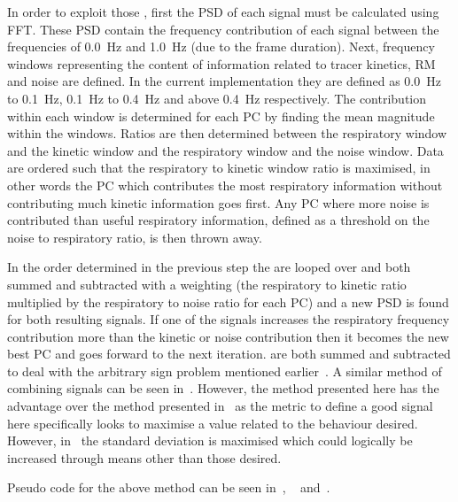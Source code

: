                     In order to exploit those , first the \gls{PSD} of each signal must be calculated using \gls{FFT}. These \gls{PSD} contain the frequency contribution of each signal between the frequencies of \SI{0.0}{\hertz} and \SI{1.0}{\hertz} (due to the frame duration). Next, frequency windows representing the content of information related to tracer kinetics, \gls{RM} and noise are defined. In the current implementation they are defined as \SI{0.0}{\hertz} to \SI{0.1}{\hertz}, \SI{0.1}{\hertz} to \SI{0.4}{\hertz} and above \SI{0.4}{\hertz} respectively. The contribution within each window is determined for each \gls{PC} by finding the mean magnitude within the windows. Ratios are then determined between the respiratory window and the kinetic window and the respiratory window and the noise window. Data are ordered such that the respiratory to kinetic window ratio is maximised, in other words the \gls{PC} which contributes the most respiratory information without contributing much kinetic information goes first. Any \gls{PC} where more noise is contributed than useful respiratory information, defined as a threshold on the noise to respiratory ratio, is then thrown away.
                    
                    In the order determined in the previous step the  are looped over and both summed and subtracted with a weighting (the respiratory to kinetic ratio multiplied by the respiratory to noise ratio for each \gls{PC}) and a new \gls{PSD} is found for both resulting signals. If one of the signals increases the respiratory frequency contribution more than the kinetic or noise contribution then it becomes the new best \gls{PC} and goes forward to the next iteration.  are both summed and subtracted to deal with the arbitrary sign problem mentioned earlier~. A similar method of combining signals can be seen in~. However, the method presented here has the advantage over the method presented in~ as the metric to define a good signal here specifically looks to maximise a value related to the behaviour desired. However, in~ the standard deviation is maximised which could logically be increased through means other than those desired.
                    
                    Pseudo code for the above method can be seen in~, ~ and~.
                    
